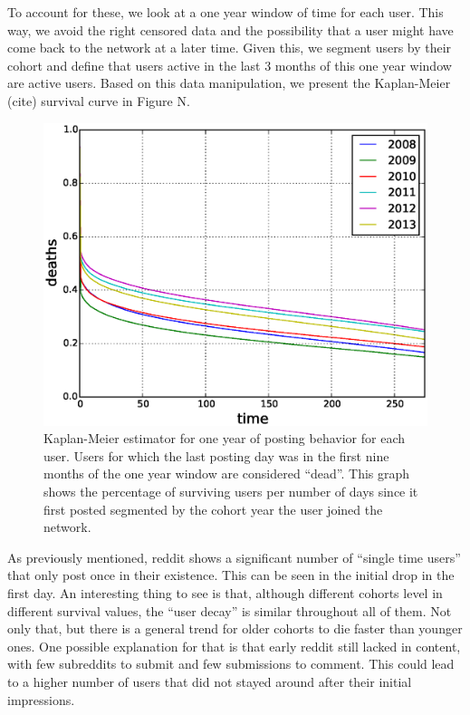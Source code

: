 To account for these, we look at a one year window of time for each user. This way, we avoid the right censored data and the possibility that a user might have come back to the network at a later time. Given this, we segment users by their cohort and define that users active in the last 3 months of this one year window are active users. Based on this data manipulation, we present the Kaplan-Meier (cite) survival curve in Figure N.

\begin{figure}[!tb]
\centering
\includegraphics[scale=0.4]{./images/kaplan_meier_users.eps}
\caption{Kaplan-Meier estimator for one year of posting behavior for each user. Users for which the last posting day was in the first nine months of the one year window are considered ``dead''. This graph shows the percentage of surviving users per number of days since it first posted segmented by the cohort year the user joined the network.}
\label{fig:kaplan_meier_users}
\end{figure}

As previously mentioned, reddit shows a significant number of ``single time users'' that only post once in their existence. This can be seen in the initial drop in the first day. An interesting thing to see is that, although different cohorts level in different survival values, the ``user decay'' is similar throughout all of them. Not only that, but there is a general trend for older cohorts to die faster than younger ones. One possible explanation for that is that early reddit still lacked in content, with few subreddits to submit and few submissions to comment. This could lead to a higher number of users that did not stayed around after their initial impressions. 

